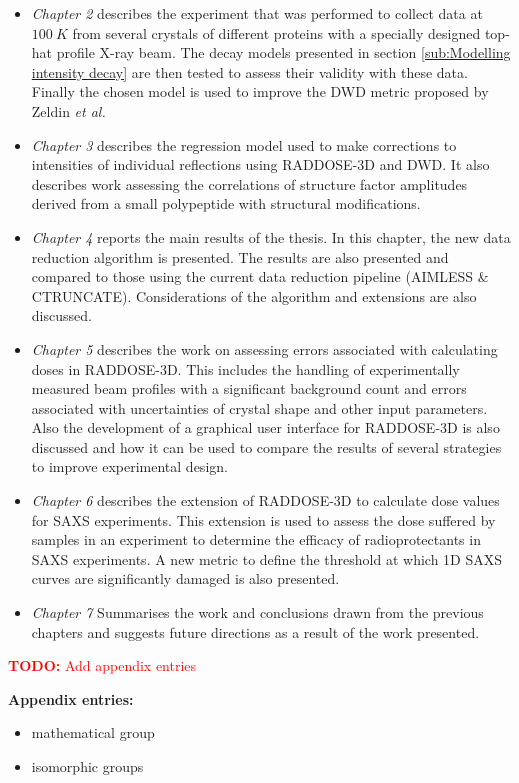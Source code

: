 	\begin{itemize}
        \item \textit{Chapter 2} describes the experiment that was performed to collect data at $100\ K$ from several crystals of different proteins with a specially designed top-hat profile X-ray beam.
		The decay models presented in section \ref{sub:Modelling intensity decay} are then tested to assess their validity with these data.
		Finally the chosen model is used to improve the DWD metric proposed by Zeldin \textit{et al.}
		\item \textit{Chapter 3} describes the regression model used to make corrections to intensities of individual reflections using RADDOSE-3D and DWD.
		It also describes work assessing the correlations of structure factor amplitudes derived from a small polypeptide with structural modifications.
		\item \textit{Chapter 4} reports the main results of the thesis. In this chapter, the new data reduction algorithm is presented.
		The results are also presented and compared to those using the current data reduction pipeline (AIMLESS \& CTRUNCATE).
		Considerations of the algorithm and extensions are also discussed.
		\item \textit{Chapter 5} describes the work on assessing errors associated with calculating doses in RADDOSE-3D.
		This includes the handling of experimentally measured beam profiles with a significant background count and errors associated with uncertainties of crystal shape and other input parameters.
		Also the development of a graphical user interface for RADDOSE-3D is also discussed and how it can be used to compare the results of several strategies to improve experimental design.
		\item \textit{Chapter 6} describes the extension of RADDOSE-3D to calculate dose values for SAXS experiments. 
		This extension is used to assess the dose suffered by samples in an experiment to determine the efficacy of radioprotectants in SAXS experiments. 
		A new metric to define the threshold at which 1D SAXS curves are significantly damaged is also presented.
        \textcolor{red}{
        }
		\item \textit{Chapter 7} Summarises the work and conclusions drawn from the previous chapters and suggests future directions as a result of the work presented.
    \end{itemize}

\textcolor{red}{
    \begin{myenumerate}
        \item \hypertarget{todo:Add appendix entries}{\textbf{TODO:} Add appendix entries}
    \end{myenumerate}
}

\textbf{Appendix entries:}
\newline
\begin{itemize}
    \item mathematical group
    \item isomorphic groups
\end{itemize}
